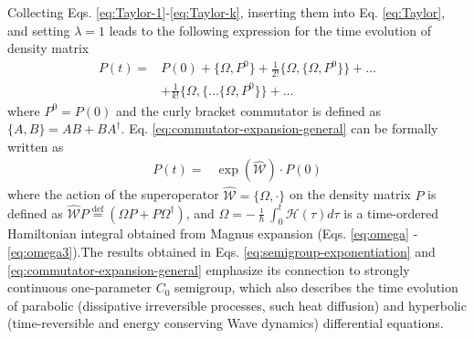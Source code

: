 \documentclass[journal=jctcce,manuscript=article,etalmode=truncate,maxauthors=10,layout=twocolumn,9pt]{achemso}   %
\begin{document}
Collecting Eqs. \ref{eq:Taylor-1}-\ref{eq:Taylor-k},  inserting them into Eq. \ref{eq:Taylor}, 
and setting $\lambda=1$  leads to the following  expression for the time evolution of density matrix 
\begin{align}
P(t) =&  P(0) + \{ \Omega, P^0 \} + \frac{1}{2!} \{ \Omega, \{ \Omega, P^0 \} \} + \ldots \nonumber \\
      &+ \frac{1}{k!}     \{ \Omega, \{ \ldots \{ \Omega, P^0 \} \} +\ldots
\label{eq:commutator-expansion-general}
\end{align}
where $P^0=P(0)$  and
 the curly bracket commutator  is  defined  as  $\{A,B \}= AB+BA^\dag$. 
Eq. \ref{eq:commutator-expansion-general}  can be formally written  as 
\begin{align}
P(t) =&  \exp(\hat {\mathcal{ W}}) \cdot P(0)
\label{eq:semigroup-exponentiation}
\end{align}
where the action of  the superoperator $\hat{\mathcal{ W}} = \{ \Omega,\cdot\}$   on the  density matrix $P $ is defined as
 $\hat{\mathcal{W}} P  \stackrel{\text{def}}{=}  (\Omega P + P \Omega^\dag)$, and  $\Omega = -\frac{\imath}{\hbar} \int_0^t \mathcal H(\tau)d\tau$
is a time-ordered Hamiltonian integral obtained from Magnus expansion (Eqs. \ref{eq:omega} -\ref{eq:omega3}).The results  obtained  in   Eqs. \ref{eq:semigroup-exponentiation}  and \ref{eq:commutator-expansion-general} emphasize its connection to strongly continuous one-parameter $C_0$ semigroup, \cite{PDE} which also describes the time evolution of parabolic (dissipative irreversible processes, such heat diffusion) and hyperbolic (time-reversible and energy conserving Wave dynamics) differential  equations.
\end{document}
